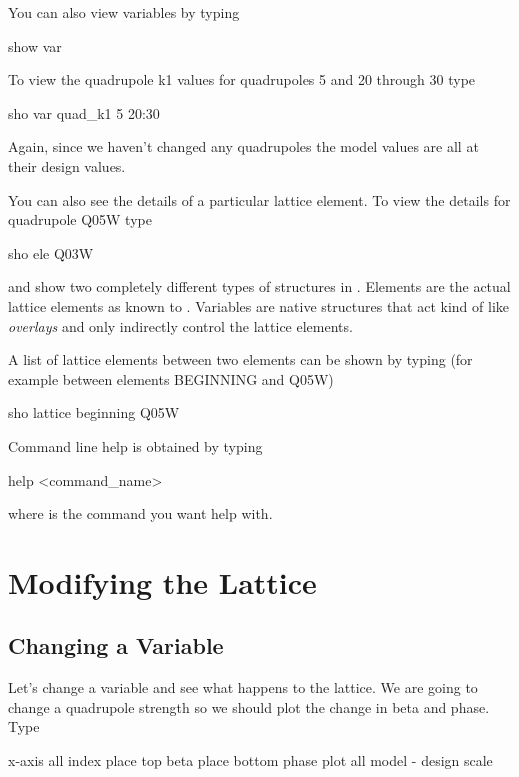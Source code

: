 You can also view variables by typing
\begin{example}
  show var
\end{example}
To view the quadrupole k1 values for \cesr quadrupoles 5  and 20 through 30 type
\begin{example}
  sho var quad\_k1 5 20:30
\end{example}
Again, since we haven't changed any quadrupoles the model values are all at their
design values.

You can also see the details of a particular lattice element. To view the details
for quadrupole Q05W type
\begin{example}
  sho ele Q03W
\end{example}

 and  show two completely different types of
structures in \tao. Elements are the actual lattice elements as known to \bmad. 
Variables are native \tao structures that act kind of like \bmad
\textit{overlays} and only indirectly control the lattice elements.

A list of lattice elements between two elements can be shown by typing (for
example between elements BEGINNING and Q05W)
\begin{example}
  sho lattice beginning Q05W
\end{example}

Command line help is obtained by typing
\begin{example}
  help <command\_name>
\end{example}
where  is the command you want help with.

\section{Modifying the Lattice}
\label{s:modify_lattice}

\subsection{Changing a Variable}
\label{ss:put_it_back}

Let's change a variable and see what happens to the lattice. We are going to
change a quadrupole strength so we should plot the change in beta and phase.
Type
\begin{example}
  x-axis all index
  place top beta
  place bottom phase
  plot all model - design
  scale
\end{example}

